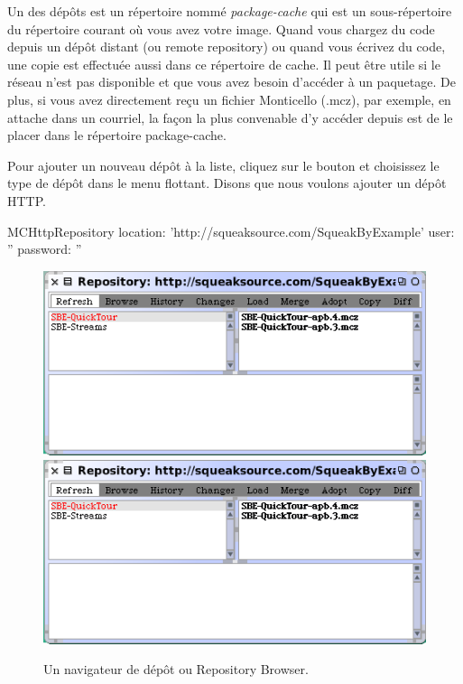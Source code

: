 \documentclass[a4paper,10pt,twoside]{book}
\begin{document}
Un des d\'ep\^ots est un r\'epertoire nomm\'e \emph{package-cache} qui
est un sous-r\'epertoire du r\'epertoire courant o\`u vous avez
votre image.
Quand vous chargez du code depuis un d\'ep\^ot distant (ou remote repository)
ou quand vous \'ecrivez du code, une copie est effectu\'ee aussi dans ce
r\'epertoire de cache. Il peut \^etre utile si le r\'eseau n'est pas 
disponible et que vous avez besoin d'acc\'eder \`a un paquetage. De plus,
si vous avez directement re\c{c}u un fichier Monticello (.mcz), par exemple, 
en attache dans un courriel, la fa\c{c}on la plus convenable d'y acc\'eder
depuis \sq est de le placer dans le r\'epertoire package-cache.

Pour ajouter un nouveau d\'ep\^ot \`a la liste, cliquez sur le bouton 
 et choisissez le type de d\'ep\^ot dans le menu
flottant. Disons que nous voulons ajouter un d\'ep\^ot HTTP.

\begin{code}{}
MCHttpRepository
	location: 'http://squeaksource.com/SqueakByExample'
	user: ''
	password: ''
\end{code}

\begin{figure}[btp]
	\begin{center}
	\ifluluelse
		{\includegraphics[width=\textwidth]{SqueakSource-SBE}}
		{\includegraphics[scale=0.7]{SqueakSource-SBE}}
	\end{center}
	\caption{Un navigateur de d\'ep\^ot ou Repository Browser.}
	\label{fig:SqueakSource:SBE}
\end{figure}
\noindent
\end{document}
